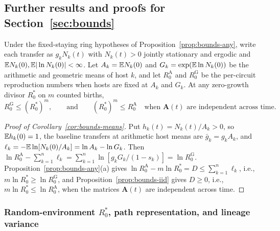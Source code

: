 \subsection{Further results and proofs for Section~\ref{sec:bounds}}

\begin{corollary}\label{cor:bounds-means}
Under the fixed-staying ring hypotheses of Proposition~\ref{prop:bounds-any}, write each transfer as $g_k N_k(t)$ with $N_k(t) > 0$ jointly stationary and ergodic and $\mathbb{E} N_k(0), \mathbb{E}|\ln N_k(0)| < \infty$. Let $A_k = \mathbb{E} N_k(0)$ and $G_k = \exp(\mathbb{E}\ln N_k(0))$ be the arithmetic and geometric means of host $k$, and let $R_0^{\mathrm{A}}$ and $R_0^{\mathrm{G}}$ be the per-circuit reproduction numbers when hosts are fixed at $A_k$ and $G_k$. At any zero-growth divisor $R_0^*$ on $m$ counted births,
\begin{equation}
R_0^{\mathrm{G}} \le (R_0^*)^m, \qquad \text{and} \qquad (R_0^*)^m \le R_0^{\mathrm{A}} \quad \text{when } \mathbf{A}(t) \text{ are independent across time}.
\label{eq:bounds-means}
\end{equation}
\end{corollary}

\begin{proof}[Proof of Corollary~{\upshape\ref{cor:bounds-means}}]
Put $h_k(t) = N_k(t)/A_k > 0$, so $\mathbb{E} h_k(0) = 1$, the baseline transfers at arithmetic host means are $\bar{g}_k = g_k A_k$, and $\ell_k = -\mathbb{E}\ln[N_k(0)/A_k] = \ln A_k - \ln G_k$. Then $\ln R_0^{\mathrm{A}} - \sum_{k=1}^n \ell_k = \sum_{k=1}^n \ln[g_k G_k/(1 - s_k)] = \ln R_0^{\mathrm{G}}$. Proposition~\ref{prop:bounds-any}(a) gives $\ln R_0^{\mathrm{A}} - m\ln R_0^* = D \le \sum_{k=1}^n \ell_k$, i.e., $m\ln R_0^* \ge \ln R_0^{\mathrm{G}}$, and Proposition~\ref{prop:bounds-iid} gives $D \ge 0$, i.e., $m\ln R_0^* \le \ln R_0^{\mathrm{A}}$, when the matrices $\mathbf A(t)$ are independent across time.
\end{proof}

\subsubsection{Random-environment \texorpdfstring{$R_0^*$}{R0*}, path representation, and lineage variance}\label{subsec:app-bounds-lineage}

